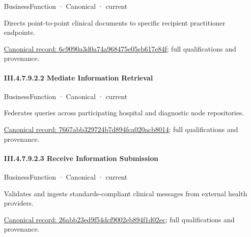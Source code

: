 \label{element:6c9090a3d0a74a968475e05eb617e84f}
{\small BusinessFunction · Canonical · current}\par

Directs point-to-point clinical documents to specific recipient practitioner endpoints.


{\footnotesize \href{../../../../../../../continuum/business/business-function/6c9090a3d0a74a968475e05eb617e84f.md}{Canonical record: 6c9090a3d0a74a968475e05eb617e84f}; full qualifications and provenance.}\par
\paragraph*{III.4.7.9.2.2 Mediate Information Retrieval}
\label{navigation:III.4.7.9.2.2}

\label{element:7667abb329724b7d894fca020acb8014}
{\small BusinessFunction · Canonical · current}\par

Federates queries across participating hospital and diagnostic node repositories.


{\footnotesize \href{../../../../../../../continuum/business/business-function/7667abb329724b7d894fca020acb8014.md}{Canonical record: 7667abb329724b7d894fca020acb8014}; full qualifications and provenance.}\par
\paragraph*{III.4.7.9.2.3 Receive Information Submission}
\label{navigation:III.4.7.9.2.3}

\label{element:26abb23ed9f54dcf9002eb894f1d02ec}
{\small BusinessFunction · Canonical · current}\par

Validates and ingests standards-compliant clinical messages from external health providers.


{\footnotesize \href{../../../../../../../continuum/business/business-function/26abb23ed9f54dcf9002eb894f1d02ec.md}{Canonical record: 26abb23ed9f54dcf9002eb894f1d02ec}; full qualifications and provenance.}\par
